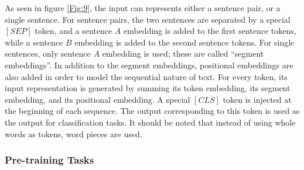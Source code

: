 As seen in figure \ref{Fig:9}, the input can represents either a sentence pair, or a single sentence. For sentence pairs, the two sentences are separated by a special $[SEP]$ token, and a sentence $A$ embedding is added to the first sentence tokens, while a sentence $B$ embedding is added to the second sentence tokens. For single sentences, only sentence $A$ embedding is used; these are called \enquote{segment embeddings}. In addition to the segment embeddings, positional embeddings \cite{gehring2017convolutional} are also added in order to model the sequential nature of text. For every token, its input representation is generated by summing its token embedding, its segment embedding, and its positional embedding. A special $[CLS]$ token is injected at the beginning of each sequence. The output corresponding to this token is used as the output for classification tasks. It should be noted that instead of using whole words as tokens, word pieces \cite{wu2016google} are used.




\subsubsection{Pre-training Tasks}
\label{bg:s4_sub4_subsub2}

